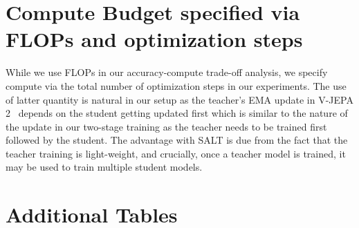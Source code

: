 \documentclass{applemlr}
\numberwithin{equation}{section}
\newcommand{\ourmethod}{SALT\xspace}
\begin{document}
\section{Compute Budget specified via FLOPs and optimization steps}
\label{appendix:sec:flops_note}
    
While we use FLOPs in our accuracy-compute trade-off analysis, we specify compute via the total number of optimization steps in our experiments. The use of latter quantity is natural in our setup as the teacher’s EMA update in V-JEPA 2~\citep{assran2025vjepa2} depends on the student getting updated first which is similar to the nature of the update in our two-stage training as the teacher needs to be trained first followed by the student. The advantage with \ourmethod is due from the fact that the teacher training is light-weight, and crucially, once a teacher model is trained, it may be used to train multiple student models.

\newpage
\section{Additional Tables}
\label{appendix:sec:addiitonal_tables_figures}
\end{document}
